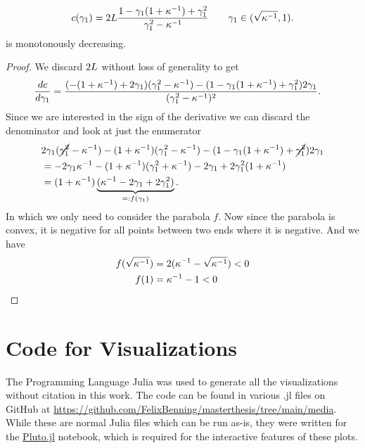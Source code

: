 \begin{lemma}\label{lem-appendix: derivative loss difference constant in gamma}
	\begin{align*}
		c(\gamma_1)
		=2L\frac{1-\gamma_1(1+\kappa^{-1}) + \gamma_1^2}{\gamma_1^2 -\kappa^{-1}}
		\qquad \gamma_1\in(\sqrt{\kappa^{-1}}, 1).
	\end{align*}
	is monotonously decreasing.
\end{lemma}
\begin{proof}
	We discard \(2L\) without loss of generality to get	
	\begin{align*}
		\frac{dc}{d\gamma_1}
		&= \frac{
			(-(1+\kappa^{-1})+2\gamma_1)(\gamma_1^2 -\kappa^{-1})
			- (1-\gamma_1(1+\kappa^{-1})+\gamma_1^2)2\gamma_1
		}{(\gamma_1^2-\kappa^{-1})^2}.
	\end{align*}
	Since we are interested in the sign of the derivative we can discard the
	denominator and look at just the enumerator
	\begin{align*}
		&2\gamma_1(\cancel{\gamma_1^2}-\kappa^{-1}) - (1+\kappa^{-1})(\gamma_1^2-\kappa^{-1})
		- (1-\gamma_1(1+\kappa^{-1})+\cancel{\gamma_1^2})2\gamma_1\\
		&= -2\gamma_1\kappa^{-1} - (1+\kappa^{-1})(\gamma_1^2 + \kappa^{-1})
		-2\gamma_1 + 2\gamma_1^2(1+\kappa^{-1})\\
		&= (1+\kappa^{-1})\underbrace{(\kappa^{-1}-2\gamma_1 + 2\gamma_1^2)}_{=:f(\gamma_1)}.
	\end{align*}
	In which we only need to consider the parabola \(f\). Now since the parabola
	is convex, it is negative for all points between two ends where it
	is negative. And we have
	\begin{align*}
		f(\sqrt{\kappa^{-1}}) &= 2(\kappa^{-1}-\sqrt{\kappa^{-1}}) < 0\\
		f(1) &= \kappa^{-1} -1 < 0
		\qedhere
	\end{align*}
\end{proof}

\chapter{Code for Visualizations}

The Programming Language Julia \parencite{bezansonJuliaFreshApproach2017} was
used to generate all the visualizations without citation in this work. The code
can be found in various .jl files on GitHub at
\url{https://github.com/FelixBenning/masterthesis/tree/main/media}. While
these are normal Julia files which can be run as-is, they were written for
the \href{https://github.com/fonsp/Pluto.jl}{Pluto.jl} notebook, which is
required for the interactive features of these plots.


\endinput